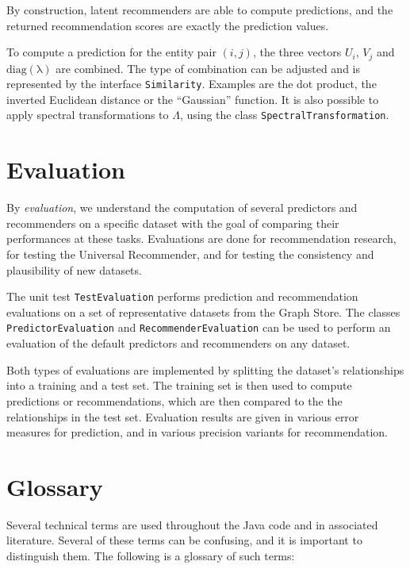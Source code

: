 \documentclass{article}
\begin{document}
By construction, latent recommenders are able to compute predictions,
and the returned recommendation scores are exactly the prediction
values. 

To compute a prediction for the entity pair $(i,j)$, the three vectors
$U_i$, $V_j$ and $\mathrm{diag(\lambda)}$ are combined.  The type of
combination can be adjusted and is represented by the interface
\texttt{Similarity}.  Examples are the dot product, the inverted
Euclidean distance or the ``Gaussian'' function.  It is also possible to
apply spectral transformations to $\Lambda$, using the class
\texttt{SpectralTransformation}. 

\section{Evaluation}
By \emph{evaluation}, we understand the computation of several
predictors and recommenders on a specific dataset with the goal of
comparing their performances at these tasks.  Evaluations are done for
recommendation research, for testing the Universal Recommender, and for testing the
consistency and plausibility of new datasets. 

The unit test \texttt{TestEvaluation} performs prediction and
recommendation evaluations on a set of representative datasets
from the Graph Store.  The classes \texttt{PredictorEvaluation} and
\texttt{RecommenderEvaluation} can be used to perform an evaluation of the
default predictors and recommenders on any dataset. 

Both types of evaluations are implemented by splitting the dataset's
relationships into a training and a test set.  The training set is then
used to compute predictions or recommendations, which are then compared
to the the relationships in the test set.  Evaluation results are given
in various error measures for prediction, and in various precision
variants for recommendation. 

\section{Glossary}
Several technical terms are used throughout the Java code and in
associated literature.  Several of these terms can be confusing, and it
is important to distinguish them.  The following is a glossary of such terms:
\end{document}
